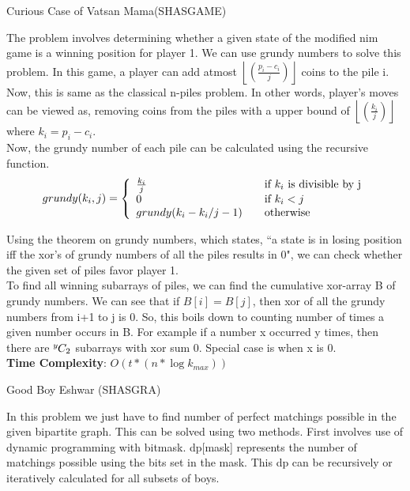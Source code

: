 \documentclass[solution,addpoints,12pt]{exam}
\providecommand{\myfloor}[1]{\left \lfloor #1 \right \rfloor }
\newcommand*{\permcomb}[4][0mu]{{{}^{#3}\mkern#1#2_{#4}}}
\newcommand*{\comb}[1][-1mu]{\permcomb[#1]{C}}
\begin{document}
\begin{questions}
\question
  Curious Case of Vatsan Mama(SHASGAME)

\begin{solution}
 
 	The problem involves determining whether a given state of the modified nim game is a winning position for player 1. We can use grundy numbers to solve this problem. In this game, a player can add atmost 
$\myfloor{(\frac{p_i - c_i}{j})}$ coins to the pile i. Now, this is same as the classical n-piles problem. In other words, player's moves can be viewed as, removing coins from the piles with a upper bound of $\myfloor{(\frac{k_i}{j})}$ where $k_i = p_i - c_i$.\\

	Now, the grundy number of each pile can be calculated using the recursive function.
	\[ grundy(k_i, j) = 
		\left\{
  			\begin{array}{l l}
  				\frac{k_i}{j} & \quad \text{if $k_i$ is divisible by j}\\
  				0 & \quad \text{if $k_i < j$}\\
			    grundy(k_i - k_i/j - 1) & \quad \text{otherwise}
			\end{array} 
		\right.
 	\]
 	
 	Using the theorem on grundy numbers, which states, ``a state is in losing position iff the xor's of grundy numbers of all the piles results in 0", we can check whether the given set of piles favor player 1.\\
 	
 	To find all winning subarrays of piles, we can find the cumulative xor-array B of grundy numbers. We can see that if $B[i] = B[j]$, then xor of all the grundy numbers from i+1 to j is 0. So, this boils down to counting number of times a given number occurs in B. For example if a number x occurred y times, then there are  $\comb{y}{2}$ subarrays with xor sum 0. Special case is when x is 0.\\
 	
 	\textbf{Time Complexity}: $O(t \ast (n \ast \log k_{max}))$ \\
 	
\end{solution}


\question
  Good Boy Eshwar (SHASGRA)

\begin{solution}
	In this problem we just have to find number of perfect matchings possible in the given bipartite graph. This can be solved using two methods. First involves use of dynamic programming with bitmask. dp[mask] represents the number of matchings possible using the bits set in the mask. This dp can be recursively or iteratively calculated for all subsets of boys. \\
	

\end{solution}
\end{questions}
\end{document}
